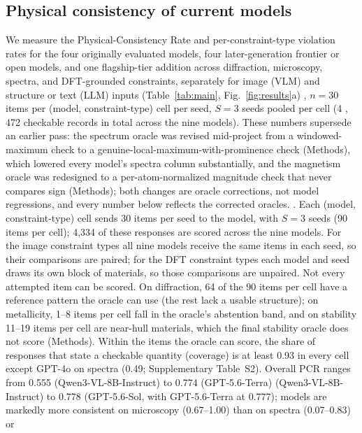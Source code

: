 \documentclass[pdflatex,sn-nature]{sn-jnl}
\newcommand{\rev}[1]{#1} %
\newcommand{\rev}[1]{{\color{blue}#1}} %
\providecommand{\DIFadd}[1]{{\protect\color{blue} \sf #1}} %
\providecommand{\DIFdel}[1]{{\protect\color{red} \scriptsize #1}} %
\providecommand{\DIFaddbegin}{} %
\providecommand{\DIFaddend}{} %
\providecommand{\DIFdelbegin}{} %
\providecommand{\DIFdelend}{} %
\providecommand{\DIFscaledelfig}{0.5}
\newlength{\DIFdelgraphicswidth} %
\newlength{\DIFdelgraphicsheight} %
\providecommand{\DIFaddincludegraphics}[2][]{{\color{blue}\fbox{\DIFOincludegraphics[#1]{#2}}}} %
\providecommand{\DIFdelincludegraphics}[2][]{%
\sbox{\DIFdelgraphicsbox}{\DIFOincludegraphics[#1]{#2}}%
\settoboxwidth{\DIFdelgraphicswidth}{\DIFdelgraphicsbox} %
\settoboxtotalheight{\DIFdelgraphicsheight}{\DIFdelgraphicsbox} %
\scalebox{\DIFscaledelfig}{%
\parbox[b]{\DIFdelgraphicswidth}{\usebox{\DIFdelgraphicsbox}\\[-\baselineskip] \rule{\DIFdelgraphicswidth}{0em}}\llap{\resizebox{\DIFdelgraphicswidth}{\DIFdelgraphicsheight}{%
\setlength{\unitlength}{\DIFdelgraphicswidth}%
\begin{picture}(1,1)%
\thicklines\linethickness{2pt} %
{\color[rgb]{1,0,0}\put(0,0){\framebox(1,1){}}}%
{\color[rgb]{1,0,0}\put(0,0){\line( 1,1){1}}}%
{\color[rgb]{1,0,0}\put(0,1){\line(1,-1){1}}}%
\end{picture}%
}\hspace*{3pt}}} %
} %
\DeclareRobustCommand{\DIFaddbegin}{\DIFOaddbegin \let\includegraphics\DIFaddincludegraphics} %
\DeclareRobustCommand{\DIFaddend}{\DIFOaddend \let\includegraphics\DIFOincludegraphics} %
\DeclareRobustCommand{\DIFdelbegin}{\DIFOdelbegin \let\includegraphics\DIFdelincludegraphics} %
\DeclareRobustCommand{\DIFdelend}{\DIFOaddend \let\includegraphics\DIFOincludegraphics} %
\begin{document}
\subsection*{Physical consistency of current models}
We measure the Physical-Consistency Rate and per-constraint-type violation rates for
the four originally evaluated models, four later-generation frontier or open models, and
one flagship-tier addition
across diffraction, microscopy, spectra, and
DFT-grounded constraints, separately for image (VLM) and structure or text (LLM)
inputs (Table~\ref{tab:main}, Fig.~\ref{fig:results}a)\DIFdelbegin \DIFdel{, $n=30$ items per (model, constraint-type) cell per seed, $S=3$ seeds
pooled per cell (4}%
\DIFdel{,}%
\DIFdel{472 checkable records in total across the nine models). These numbers
supersede an earlier pass: the spectrum oracle was revised mid-project from a
windowed-maximum check to a genuine-local-maximum-with-prominence check (Methods), which
lowered every model's spectra column substantially, and the magnetism oracle was
redesigned to a per-atom-normalized magnitude check that never compares sign (Methods);
both changes are oracle corrections, not model regressions, and every number below
reflects the corrected oracles. }\DIFdelend \DIFaddbegin \DIFadd{\rev{. Each (model, constraint-type) cell
sends 30 items per seed to the model, with $S=3$ seeds (90 items per cell); 4{,}334 of these
responses are scored across the nine models. For the image constraint types all nine models
receive the same items in each seed, so their comparisons are paired; for the DFT constraint
types each model and seed draws its own block of materials, so those comparisons are unpaired.
Not every attempted item can be scored. On diffraction, 64 of the 90 items per cell have a
reference pattern the oracle can use (the rest lack a usable structure); on metallicity, 1--8
items per cell fall in the oracle's abstention band, and on stability 11--19 items per cell are
near-hull materials, which the final stability oracle does not score (Methods). Within the items the oracle can score, the
share of responses that state a checkable quantity (coverage) is at least 0.93 in every cell
except GPT-4o on spectra (0.49; Supplementary Table~S2).} }\DIFaddend Overall PCR ranges from \DIFdelbegin \DIFdel{0.555
(Qwen3-VL-8B-Instruct) to 0.774 (GPT-5.6-Terra)}\DIFdelend \DIFaddbegin \DIFadd{\rev{0.556
(Qwen3-VL-8B-Instruct) to 0.778 (GPT-5.6-Sol, with GPT-5.6-Terra at 0.777)}}\DIFaddend ; models are
markedly more consistent on microscopy (0.67--1.00) than on spectra (0.07--0.83) or
\end{document}
